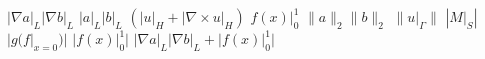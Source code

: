 \documentclass{article}
\begin{document}
$|\nabla a|_{L}|\nabla b|_{L}$ $|a|_{L}|b|_{L}$ $(|u|_{H}+|\nabla\times u|_{H})$ $f(x)|_{0}^{1}$ $\|a\|_{2}\|b\|_{2}$
$\|u|_{\Gamma}\|$ $\left|M|_{S}\right|$ $|g(f|_{x=0})|$ $|f(x)|_{0}^{1}|$
$|\nabla a|_{L}|\nabla b|_{L}+|f(x)|_{0}^{1}|$
\end{document}
